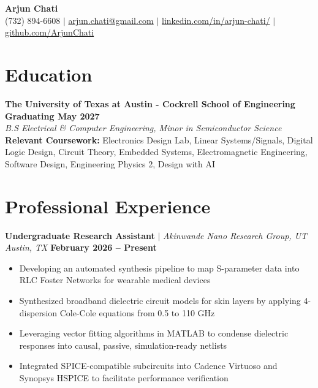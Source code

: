 \documentclass[10pt, letterpaper]{article}
\newcommand{\worksubsection}[3]{%
  \noindent\textbf{#1} $|$ \textit{#2} \hfill \textbf{#3}%
}
\begin{document}
\pagestyle{empty}

\begin{center}
    {\Huge \textbf{Arjun Chati}} \\ \vspace{2pt}
    (732) 894-6608 $|$ \href{mailto:arjun.chati@gmail.com}{arjun.chati@gmail.com} $|$ \href{https://linkedin.com/in/arjun-chati/}{linkedin.com/in/arjun-chati/} $|$ \href{https://github.com/ArjunChati}{github.com/ArjunChati}
\end{center}

\section*{Education}
\noindent\textbf{The University of Texas at Austin - Cockrell School of Engineering} \hfill \textbf{Graduating May 2027}\\
\textit{B.S Electrical \& Computer Engineering, Minor in Semiconductor Science}\\
\textbf{Relevant Coursework:} Electronics Design Lab, Linear Systems/Signals, Digital Logic Design, Circuit Theory, Embedded Systems, Electromagnetic Engineering, Software Design, Engineering Physics 2, Design with AI

\section*{Professional Experience}
\worksubsection{Undergraduate Research Assistant}{Akinwande Nano Research Group, UT Austin, TX}{February 2026 -- Present}
\begin{itemize}[leftmargin=0.1in, noitemsep, topsep=0pt, itemsep=1pt, parsep=0pt]
    \item Developing an automated synthesis pipeline to map S-parameter data into RLC Foster Networks for wearable medical devices
    \item Synthesized broadband dielectric circuit models for skin layers by applying 4-dispersion Cole-Cole equations from 0.5 to 110 GHz
    \item Leveraging vector fitting algorithms in MATLAB to condense dielectric responses into causal, passive, simulation-ready netlists
    \item Integrated SPICE-compatible subcircuits into Cadence Virtuoso and Synopsys HSPICE to facilitate performance verification
\end{itemize}
\end{document}
